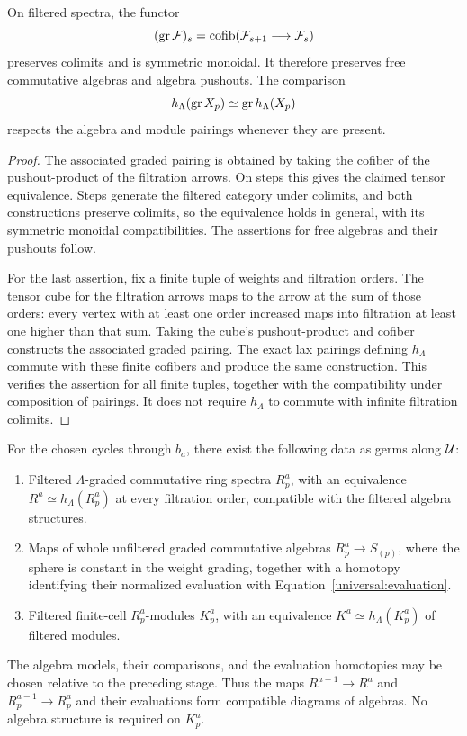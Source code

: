 \begin{lemma}\label{universal:associated-graded}
On filtered spectra, the functor
\[
 (\operatorname{gr}\mathcal F)_s
   =\operatorname{cofib}(\mathcal F_{s+1}\longrightarrow\mathcal F_s)
\]
preserves colimits and is symmetric monoidal. It therefore preserves
free commutative algebras and algebra pushouts. The comparison
\[
 h_\Lambda(\operatorname{gr} X_p)\simeq\operatorname{gr} h_\Lambda(X_p)
\]
respects the algebra and module pairings whenever they are present.
\end{lemma}

\begin{proof}
The associated graded pairing is obtained by taking the cofiber
of the pushout-product of the filtration arrows. On steps this
gives the claimed tensor equivalence. Steps generate the filtered
category under colimits, and both constructions preserve colimits,
so the equivalence holds in general, with its symmetric monoidal
compatibilities. The assertions for free algebras and their
pushouts follow.

For the last assertion, fix a finite tuple of weights and
filtration orders. The tensor cube for the filtration arrows
maps to the arrow at the sum of those orders: every vertex
with at least one order increased maps into filtration at
least one higher than that sum. Taking the cube's
pushout-product and cofiber constructs the associated graded
pairing. The exact lax pairings defining $h_\Lambda$ commute
with these finite cofibers and produce the same construction.
This verifies the assertion for all finite tuples, together
with the compatibility under composition of pairings. It
does not require $h_\Lambda$ to commute with infinite
filtration colimits.
\end{proof}

\begin{proposition}\label{universal:primewise-models}
For the chosen cycles through $b_a$, there exist the following data
as germs along $\mathcal U$:
\begin{enumerate}
\item Filtered $\Lambda$-graded commutative ring spectra $R_p^a$,
with an equivalence
$R^a\simeq h_\Lambda(R_p^a)$ at every filtration order, compatible
with the filtered algebra structures.
\item Maps of whole unfiltered graded commutative algebras
$R_p^a\to S_{(p)}$, where the sphere is constant in the weight
grading, together with a homotopy identifying their normalized
evaluation with Equation~\eqref{universal:evaluation}.
\item Filtered finite-cell $R_p^a$-modules $K_p^a$, with an
equivalence $K^a\simeq h_\Lambda(K_p^a)$ of filtered modules.
\end{enumerate}
The algebra models, their comparisons, and the evaluation
homotopies may be chosen relative to the preceding stage.
Thus the maps $R^{a-1}\to R^a$ and $R_p^{a-1}\to R_p^a$
and their evaluations form compatible diagrams of algebras.
No algebra structure is required on $K_p^a$.
\end{proposition}

